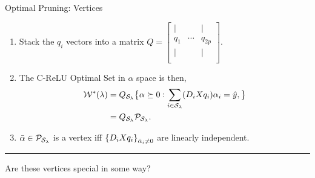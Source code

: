 \documentclass[usenames,dvipsnames,mathserif,notheorems]{beamer}
\newcommand{\horizontalrule}{
	{
			\vspace{-0.5em}
			\center \rule{\textwidth}{0.1em}
			\vspace{-0.2em}
		}
}
\newcommand{\good}[1]{\textcolor{good}{#1}}
\begin{document}
\begin{frame}{Optimal Pruning: Vertices}

	\begin{enumerate}
		\item
		      Stack the \( q_i \) vectors into a matrix \( Q =
		      \begin{bmatrix}
			      \vert &        & \vert  \\
			      q_1   & \cdots & q_{2p} \\
			      \vert &        & \vert  \\
		      \end{bmatrix}.
		      \)

		      \pause
		\item
		      The C-ReLU Optimal Set in \( \alpha \) space is then,
		      \begin{equation}
			      \begin{aligned}
				      \mathcal{W}^*(\lambda) & =
				      Q_{\mathcal{S}_\lambda} \big\{ \alpha \succeq 0  :
				      \sum_{i \in \mathcal{S}_\lambda} (D_i X q_i) \alpha_i = \hat y,
				      \big\}                                                       \\
				                      & = Q_{\mathcal{S}_\lambda} \mathcal{P}_{\mathcal{S}_\lambda}.
			      \end{aligned}
		      \end{equation}

		      \pause

		\item \( \bar \alpha \in \mathcal{P}_{\mathcal{S}_\lambda} \) is a \good{vertex}
		      iff \( \left\{D_i X q_i\right\}_{\bar \alpha_i \neq 0} \) are linearly independent.
	\end{enumerate}

	\pause
	\horizontalrule

	{\large Are these vertices \good{special} in some way?}

\end{frame}
\end{document}
